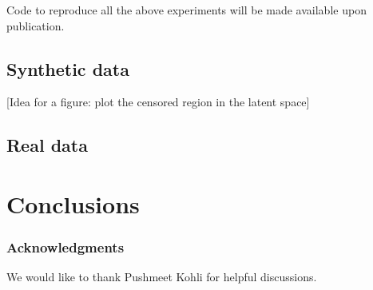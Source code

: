 \documentclass{article}
\begin{document}
Code to reproduce all the above experiments will be made available upon publication.


\subsection{Synthetic data}



[Idea for a figure: plot the censored region in the latent space]

\subsection{Real data}



\section{Conclusions}

\subsubsection*{Acknowledgments}

We would like to thank Pushmeet Kohli for helpful discussions.



\end{document}

